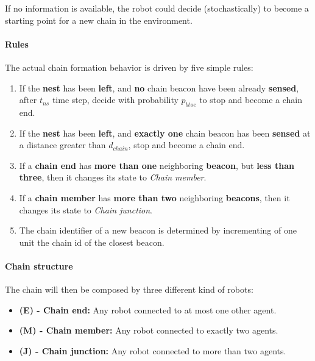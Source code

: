If no information is available, the robot could decide (stochastically) to become a starting point for a new chain in the environment. 

\paragraph{Rules}\label{par:rules}
The actual chain formation behavior is driven by five simple rules:
\begin{enumerate}
  \item If the \textbf{nest} has been \textbf{left}, and \textbf{no} chain beacon have been already \textbf{sensed}, after $t_{ns}$ time step, decide with probability $p_{btoe}$ to stop and become a chain end.
  \item If the \textbf{nest} has been \textbf{left}, and \textbf{exactly one} chain beacon has been \textbf{sensed} at a distance greater than $d_{chain}$, stop and become a chain end.
  \item If a \textbf{chain end} has \textbf{more than one} neighboring\textbf{ beacon}, but \textbf{less than three}, then it changes its state to \emph{Chain member}.
  \item If a \textbf{chain member} has \textbf{more than two} neighboring \textbf{beacons}, then it changes its state to \emph{Chain junction}.
  \item The chain identifier of a new beacon is determined by incrementing of one unit the chain id of the closest beacon.
\end{enumerate}

\paragraph{Chain structure}
The chain will then be composed by three different kind of robots:
\begin{itemize}
  \item \textbf{(E) - Chain end:} Any robot connected to at most one other agent.
  \item \textbf{(M) - Chain member:} Any robot connected to exactly two agents.
  \item \textbf{(J) - Chain junction:} Any robot connected to more than two agents.
\end{itemize}

\begin{center}
\end{center}



